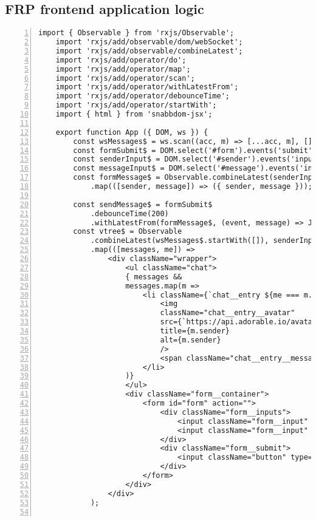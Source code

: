 \begin{appendices}
	\chapter{FRP frontend application logic}
	\label{appendix:frp}
	
	\begin{lstlisting}[numbers=left]
	import { Observable } from 'rxjs/Observable';
	import 'rxjs/add/observable/dom/webSocket';
	import 'rxjs/add/observable/combineLatest';
	import 'rxjs/add/operator/do';
	import 'rxjs/add/operator/map';
	import 'rxjs/add/operator/scan';
	import 'rxjs/add/operator/withLatestFrom';
	import 'rxjs/add/operator/debounceTime';
	import 'rxjs/add/operator/startWith';
	import { html } from 'snabbdom-jsx';
	
	export function App ({ DOM, ws }) {
		const wsMessages$ = ws.scan((acc, m) => [...acc, m], []);
		const formSubmit$ = DOM.select('#form').events('submit').do(e => e.preventDefault());
		const senderInput$ = DOM.select('#sender').events('input').map(e => e.target.value);
		const messageInput$ = DOM.select('#message').events('input').map(e => e.target.value);
		const formMessage$ = Observable.combineLatest(senderInput$, messageInput$)
			.map(([sender, message]) => ({ sender, message }));
		
		const sendMessage$ = formSubmit$
			.debounceTime(200)
			.withLatestFrom(formMessage$, (event, message) => JSON.stringify(message));
		const vtree$ = Observable
			.combineLatest(wsMessages$.startWith([]), senderInput$.startWith(''))
			.map(([messages, me]) =>
				<div className="wrapper">
					<ul className="chat">
					{ messages &&
					messages.map(m =>
						<li className={`chat__entry ${me === m.sender && 'chat__entry--mine'}`}>
							<img
							className="chat__entry__avatar"
							src={`https://api.adorable.io/avatars/32/${m.sender}.svg`}
							title={m.sender}
							alt={m.sender}
							/>
							<span className="chat__entry__message">{m.message}</span>
						</li>
					)}
					</ul>
					<div className="form__container">
						<form id="form" action="">
							<div className="form__inputs">
								<input className="form__input" id="sender" type="text" placeholder="Your name"/>
								<input className="form__input" id="message" type="text" placeholder="Type a message..." />
							</div>
							<div className="form__submit">
								<input className="button" type="submit" id="button__send" value="Send" />
							</div>
						</form>
					</div>
				</div>
			);
		

\end{lstlisting}
\end{appendices}
